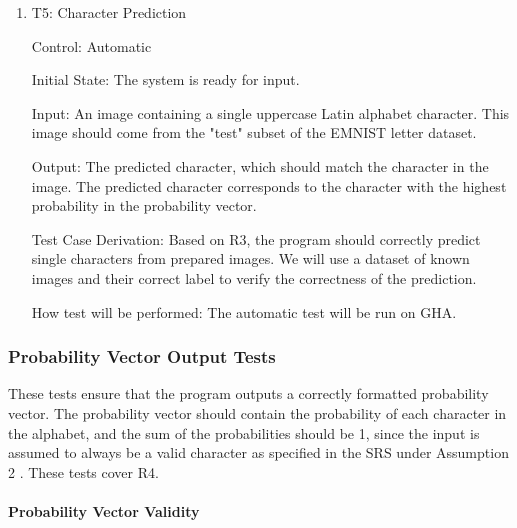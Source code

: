 \documentclass[12pt, titlepage]{article}
\begin{document}
\begin{enumerate}

\item{T5: Character Prediction\\}

Control: Automatic

Initial State: The \progname{} system is ready for input.

Input: An image containing a single uppercase Latin alphabet character. This
image should come from the "test" subset of the EMNIST letter dataset.

Output: The predicted character, which should match the character in the image.
The predicted character corresponds to the character with the highest
probability in the probability vector.

Test Case Derivation: Based on R3, the program should correctly predict single
characters from prepared images. We will use a dataset of known images and their
correct label to verify the correctness of the prediction.

How test will be performed: The automatic test will be run on GHA.

\end{enumerate}

\subsubsection{Probability Vector Output Tests}

These tests ensure that the program outputs a correctly formatted probability
vector. The probability vector should contain the probability of each character
in the alphabet, and the sum of the probabilities should be 1, since the
input is assumed to always be a valid character as specified in the SRS
under Assumption 2 \citep{SRS}. These tests cover R4.

\paragraph{Probability Vector Validity}
\end{document}
